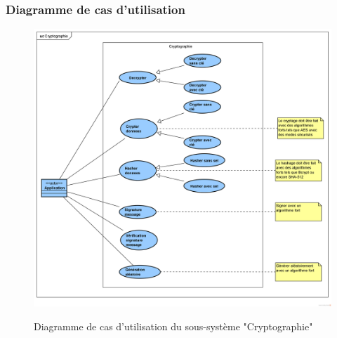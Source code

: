 \subsubsection{Diagramme de cas d'utilisation}
\begin{figure}[H]
	\centering
	\begin{minipage}{12cm}
		\centering
		{\includegraphics[height=0.35\textheight, width=1\textwidth]{fig/Cryptographie-use-case-diagram.png}}
	\end{minipage}
	\caption{Diagramme de cas d'utilisation du sous-système "Cryptographie"}
	\label{fig:7.14}
\end{figure}

